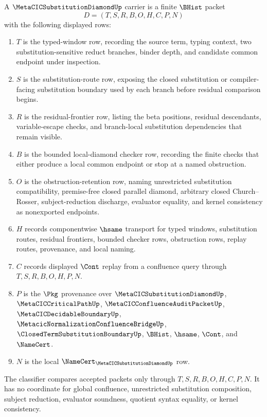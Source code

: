 \begin{definition}
\label{def:metacic-substitution-diamond-carrier}
A $\MetaCICSubstitutionDiamondUp$ carrier is a finite $\BHist$ packet
$$
D=(T,S,R,B,O,H,C,P,N)
$$
with the following displayed rows:
\begin{enumerate}
\item $T$ is the typed-window row, recording the source term, typing context, two substitution-sensitive reduct branches, binder depth, and candidate common endpoint under inspection.
\item $S$ is the substitution-route row, exposing the closed substitution or compiler-facing substitution boundary used by each branch before residual comparison begins.
\item $R$ is the residual-frontier row, listing the beta positions, residual descendants, variable-escape checks, and branch-local substitution dependencies that remain visible.
\item $B$ is the bounded local-diamond checker row, recording the finite checks that either produce a local common endpoint or stop at a named obstruction.
\item $O$ is the obstruction-retention row, naming unrestricted substitution compatibility, premise-free closed parallel diamond, arbitrary closed Church--Rosser, subject-reduction discharge, evaluator equality, and kernel consistency as nonexported endpoints.
\item $H$ records componentwise $\hsame$ transport for typed windows, substitution routes, residual frontiers, bounded checker rows, obstruction rows, replay routes, provenance, and local naming.
\item $C$ records displayed $\Cont$ replay from a confluence query through $T,S,R,B,O,H,P,N$.
\item $P$ is the $\Pkg$ provenance over $\MetaCICSubstitutionDiamondUp$, $\MetaCICCriticalPathUp$, $\MetaCICConfluenceAuditPacketUp$, $\MetaCICDecidableBoundaryUp$, $\MetacicNormalizationConfluenceBridgeUp$, $\ClosedTermSubstitutionBoundaryUp$, $\BHist$, $\hsame$, $\Cont$, and $\NameCert$.
\item $N$ is the local $\NameCert_{\MetaCICSubstitutionDiamondUp}$ row.
\end{enumerate}
The classifier compares accepted packets only through $T,S,R,B,O,H,C,P,N$. It has no coordinate for global confluence, unrestricted substitution composition, subject reduction, evaluator soundness, quotient syntax equality, or kernel consistency.
\end{definition}

